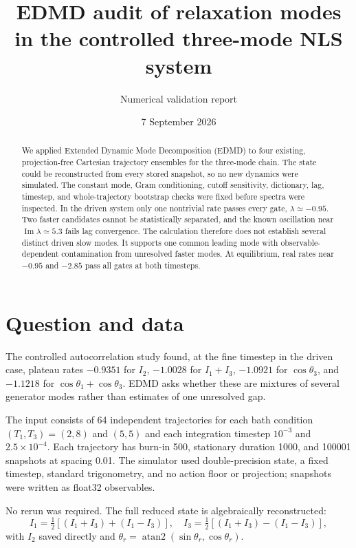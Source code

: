 \documentclass[10pt]{article}
\title{EDMD audit of relaxation modes in the controlled three-mode NLS system}
\author{Numerical validation report}
\date{7 September 2026}
\begin{document}
\maketitle

\begin{abstract}
We applied Extended Dynamic Mode Decomposition (EDMD) to four existing,
projection-free Cartesian trajectory ensembles for the three-mode chain.  The
state could be reconstructed from every stored snapshot, so no new dynamics
were simulated.  The constant mode, Gram conditioning, cutoff sensitivity,
dictionary, lag, timestep, and whole-trajectory bootstrap checks were fixed
before spectra were inspected.  In the driven system only one nontrivial rate
passes every gate, $\lambda\simeq-0.95$.  Two faster candidates cannot be
statistically separated, and the known oscillation near
$\operatorname{Im}\lambda\simeq5.3$ fails lag convergence.  The calculation
therefore does not establish several distinct driven slow modes.  It supports
one common leading mode with observable-dependent contamination from unresolved
faster modes.  At equilibrium, real rates near $-0.95$ and $-2.85$ pass all
gates at both timesteps.
\end{abstract}

\section{Question and data}
The controlled autocorrelation study found, at the fine timestep in the driven
case, plateau rates $-0.9351$ for $I_2$, $-1.0028$ for $I_1+I_3$, $-1.0921$
for $\cos\theta_3$, and $-1.1218$ for
$\cos\theta_1+\cos\theta_3$.  EDMD asks whether these are mixtures of several
generator modes rather than estimates of one unresolved gap.

The input consists of 64 independent trajectories for each bath condition
$(T_1,T_3)=(2,8)$ and $(5,5)$ and each integration timestep
$10^{-3}$ and $2.5\times10^{-4}$.  Each trajectory has burn-in 500,
stationary duration 1000, and 100001 snapshots at spacing 0.01.  The simulator
used double-precision state, a fixed timestep, standard trigonometry, and no
action floor or projection; snapshots were written as float32 observables.

No rerun was required.  The full reduced state is algebraically reconstructed:
\[
I_1=\tfrac12[(I_1+I_3)+(I_1-I_3)],\quad
I_3=\tfrac12[(I_1+I_3)-(I_1-I_3)],
\]
with $I_2$ saved directly and
$\theta_r=\operatorname{atan2}(\sin\theta_r,\cos\theta_r)$.
\end{document}
